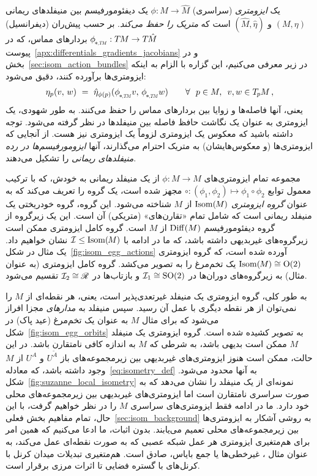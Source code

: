 یک \emph{ایزومتری} (سراسری) $\phi: M \to \hat{M}$ یک دیفئومورفیسم بین منیفلدهای ریمانی $(M,\eta)$ و $(\hat{M},\hat{\eta})$ است که \emph{متریک را حفظ می‌کند}.
بر حسب پیش‌ران (دیفرانسیل) $\dphiTM: \TM \to T\mkern-1.5mu\hat{M}$ بردارهای مماس، که در پیوست~\ref{apx:differentials_gradients_jacobians} و در بخش~\ref{sec:isom_action_bundles} در زیر معرفی می‌کنیم، این گزاره با الزام به اینکه ایزومتری‌ها برآورده کنند، دقیق می‌شود:
\begin{align}\label{eq:isometry_def}
    \eta_p(v,\, w)\ =\ \hat{\eta}_{\phi(p)}( \dphiTM v,\, \dphiTM w) \qquad \forall\ \ p\in M,\,\ v,w\in \TpM \,,
\end{align}
یعنی، آنها فاصله‌ها و زوایا بین بردارهای مماس را حفظ می‌کنند.
به طور شهودی، یک ایزومتری به عنوان یک نگاشت حافظ فاصله بین منیفلدها در نظر گرفته می‌شود.
توجه داشته باشید که معکوس یک ایزومتری لزوماً یک ایزومتری نیز هست.
از آنجایی که ایزومتری‌ها (و معکوس‌هایشان) به متریک احترام می‌گذارند، آنها \emph{ایزومورفیسم‌ها در رده منیفلدهای ریمانی} را تشکیل می‌دهند.


مجموعه تمام ایزومتری‌های $\phi: M \to M$ از یک منیفلد ریمانی به خودش، که با ترکیب معمول توابع $\circ: (\phi_1, \phi_2) \mapsto \phi_1 \circ \phi_2$ مجهز شده است، یک گروه را تعریف می‌کند که به عنوان \emph{گروه ایزومتری} $\operatorname{Isom}(\mkern-1.5mu M \mkern-.5mu)$ از $M$ شناخته می‌شود.
این گروه، گروه خودریختی یک منیفلد ریمانی است که شامل تمام «تقارن‌های» (متریکی) آن است.
این یک زیرگروه از گروه دیفئومورفیسم $\operatorname{Diff}(M)$ از $M$ است.
گروه کامل ایزومتری ممکن است زیرگروه‌های غیربدیهی داشته باشد، که ما در ادامه با $\mathcal{I} \leq \operatorname{Isom}(\mkern-1.5mu M \mkern-.5mu)$ نشان خواهیم داد.
یک مثال در شکل~\ref{fig:isom_egg_actions} آورده شده است، که گروه ایزومتری $\operatorname{Isom}(\mkern-1.5mu M \mkern-.5mu) \cong \operatorname{O}(2)$ یک تخم‌مرغ را به تصویر می‌کشد.
گروه کامل ایزومتری (به عنوان مثال) به زیرگروه‌های دوران‌ها در $\mathcal{I}_1 \cong \operatorname{SO}(2)$ و بازتاب‌ها در $\mathcal{I}_2 \cong \mathscr{R}$ تقسیم می‌شود.


به طور کلی، گروه ایزومتری یک منیفلد غیرتعدی‌پذیر است، یعنی، هر نقطه‌ای از $M$ را نمی‌توان از هر نقطه دیگری با عمل آن رسید.
سپس منیفلد به \emph{مدارهای} مجزا افراز می‌شود که برای مثال $M$ به عنوان یک تخم‌مرغ (عید پاک) در شکل~\ref{fig:isom_egg_orbits} به تصویر کشیده شده است.
گروه ایزومتری یک منیفلد $M$ ممکن است بدیهی باشد، به شرطی که $M$ به اندازه کافی نامتقارن باشد.
در این حالت، ممکن است هنوز ایزومتری‌های غیربدیهی بین زیرمجموعه‌های باز $U^{\widetilde{A}}$ و $U^A$ از $M$ وجود داشته باشد، که معادله~\eqref{eq:isometry_def} به آنها محدود می‌شود.
شکل~\ref{fig:suzanne_local_isometry} نمونه‌ای از یک منیفلد را نشان می‌دهد که به صورت سراسری نامتقارن است اما ایزومتری‌های غیربدیهی بین زیرمجموعه‌های محلی خود دارد.
ما در ادامه فقط ایزومتری‌های سراسری $M$ را در نظر خواهیم گرفت، با این حال، تمام مفاهیم بخش فعلی~\ref{sec:isom_background} به روشی آشکار به ایزومتری‌ها بین زیرمجموعه‌های محلی تعمیم می‌یابند.
بدون اثبات، ما ادعا می‌کنیم که همین امر برای هم‌متغیری ایزومتری هر عمل شبکه عصبی که به صورت نقطه‌ای عمل می‌کند، به عنوان مثال \onexones، غیرخطی‌ها یا جمع بایاس، صادق است.
هم‌متغیری تبدیلات میدان کرنل با کرنل‌های با گستره فضایی تا اثرات مرزی برقرار است.

